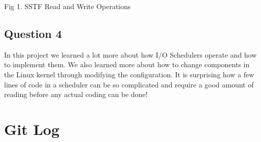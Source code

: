 \documentclass[10pt,draftclsnofoot,onecolumn, compsoc]{IEEEtran}
\begin{document}
\vspace{5mm} %

Fig 1. SSTF Read and Write Operations
\centering
\begin{figure}[htb]
\centering
\end{figure}

\newpage
\subsection{Question 4}
In this project we learned a lot more about how I/O Schedulers operate and how to implement them. We also learned more about how to change components in the Linux kernel through modifying the configuration. It is surprising how a few lines of code in a scheduler can be so complicated and require a good amount of reading before any actual coding can be done! 

\section{Git Log}
\end{document}
